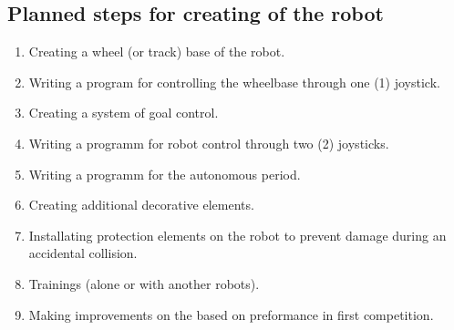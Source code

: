 \subsection{Planned steps for creating of the robot}
\begin{enumerate}
	\item Creating a wheel (or track) base of the robot.
	\item Writing a program for controlling the wheelbase through one (1) joystick.
	\item Creating a system of goal control.
	\item Writing a programm for robot control through two (2) joysticks.
	\item Writing a programm for the autonomous period.
	\item Creating additional decorative elements.
	\item Installating protection elements on the robot to prevent damage during an accidental collision.
	\item Trainings (alone or with another robots).
	\item Making improvements on the based on preformance in first competition.
\end{enumerate}
\fillpage
